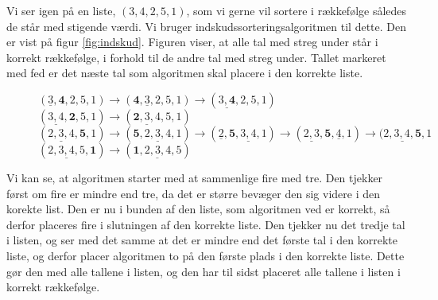 \begin{exmp}
Vi ser igen på en liste, $(3,4,2,5,1)$, som vi gerne vil sortere i rækkefølge således de står med stigende værdi. Vi bruger indskudssorteringsalgoritmen til dette. Den er vist på figur \autoref{fig:indskud}. Figuren viser, at alle tal med streg under står i korrekt rækkefølge, i forhold til de andre tal med streg under. Tallet markeret med fed er det næste tal som algoritmen skal placere i den korrekte liste.

\begin{figure}[H]
\label{fig:indskud}
	\begin{flushleft}
	$(\underline{3},\textbf{4},2,5,1) \rightarrow (\textbf{4}, \underline{3},2,5,1)\rightarrow (\underline{3,\textbf{4}},2,5,1)$ \\
	$(\underline{3,4},\textbf{2},5,1) \rightarrow (\underline{\textbf{2},3,4},5,1) $\\
	$(\underline{2,3,4},\textbf{5},1) \rightarrow (\textbf{5},\underline{2,3,4},1) \rightarrow (\underline{2}, \textbf{5},\underline{3,4},1) \rightarrow (\underline{2,3}, \textbf{5}, \underline{4},1) \rightarrow (\underline{2,3,4,\textbf{5}},1 $ \\
	$(\underline{2,3,4,5},\textbf{1}) \rightarrow (\underline{\textbf{1},2,3,4,5}) $\\
 	\end{flushleft}
\end{figure}

Vi kan se, at algoritmen starter med at sammenlige fire med tre. Den tjekker først om fire er mindre end tre, da det er større bevæger den sig videre i den korekte list. Den er nu i bunden af den liste, som algoritmen ved er korrekt, så derfor placeres fire i slutningen af den korrekte liste. Den tjekker nu det tredje tal i listen, og ser med det samme at det er mindre end det første tal i den korrekte liste, og derfor placer algoritmen to på den første plads i den korrekte liste. Dette gør den med alle tallene i listen, og den har til sidst placeret alle tallene i listen i korrekt rækkefølge.

\end{exmp}
